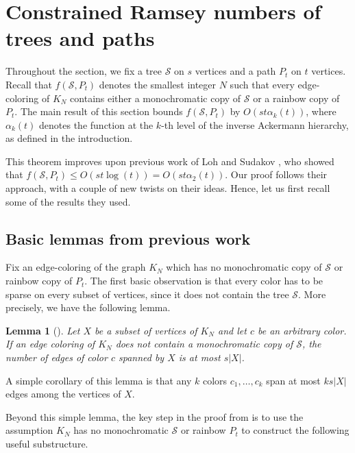 \documentclass[a4paper,11pt]{article}
\newtheorem{lemma}[theorem]{\bf Lemma}
\theoremstyle{definition}
\def\cS{\mathcal{S}}
\begin{document}
\section{Constrained Ramsey numbers of trees and paths}\label{sec:ackermann}

Throughout the section, we fix a tree $\cS$ on $s$ vertices and a path $P_t$ on $t$ vertices. Recall that $f(\cS, P_t)$ denotes the smallest integer $N$ such that every edge-coloring of $K_N$ contains either a monochromatic copy of $\cS$ or a rainbow copy of $P_t$. The main result of this section bounds $f(\cS, P_t)$ by $O(st\alpha_k(t))$, where $\alpha_k(t)$ denotes the function at the $k$-th level of the inverse Ackermann hierarchy, as defined in the introduction.



This theorem improves upon previous work of Loh and Sudakov \cite{LS09}, who showed that $f(\cS, P_t)\leq O(st \log(t))=O(st \alpha_2(t))$. Our proof follows their approach, with a couple of new twists on their ideas. Hence, let us first recall some of the results they used.

\subsection{Basic lemmas from previous work}

Fix an edge-coloring of the graph $K_N$ which has no monochromatic copy of $\cS$ or rainbow copy of $P_t$. The first basic observation is that every color has to be sparse on every subset of vertices, since it does not contain the tree $\cS$. More precisely, we have the following lemma.

\begin{lemma}[{\cite[Lemma 2.1]{LS09}}]\label{lemma:sparsity}
Let $X$ be a subset of vertices of $K_N$ and let $c$ be an arbitrary color. If an edge coloring of $K_N$ does not contain a monochromatic copy of $\cS$, the number of edges of color $c$ spanned by $X$ is at most $s|X|$.
\end{lemma}

A simple corollary of this lemma is that any $k$ colors $c_1, \dots, c_k$ span at most $ks|X|$ edges among the vertices of $X$. 

Beyond this simple lemma, the key step in the proof from \cite{LS09} is to use the assumption $K_N$ has no monochromatic $\cS$ or rainbow $P_t$ to construct the following useful substructure.
\end{document}
